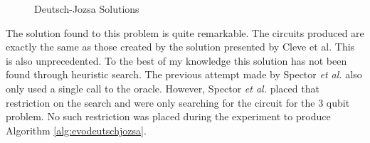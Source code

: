 \begin{figure}
\centering
{}
\caption{Deutsch-Jozsa Solutions}
\end{figure}

The solution found to this problem is quite remarkable.
The circuits produced are exactly the same as those created by the solution presented by Cleve et al\cite{Cleve98quantumalgorithms}.
This is also unprecedented.
To the best of my knowledge this solution has not been found through heuristic search.
The previous attempt made by Spector \emph{et al.}\cite{LSpectorGPforQC,LSpectorANDOR,Spector:1999:QCA:316573.317112} also only used a single call to the oracle.
However, Spector \emph{et al.} placed that restriction on the search and were only searching for the circuit for the 3 qubit problem.
No such restriction was placed during the experiment to produce Algorithm \ref{alg:evodeutschjozsa}.


